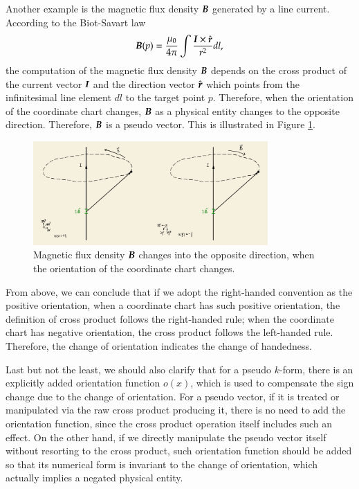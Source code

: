 \documentclass[11pt, a4paper]{book}
\begin{document}
Another example is the magnetic flux density $\boldsymbol{B}$ generated by a line current.
According to the Biot-Savart law \citep[see][page 215]{GriffithsIntroduction1999}
\begin{equation}
  \boldsymbol{B}(p) = \frac{\mu_0}{4\pi} \int \frac{\boldsymbol{I} \times \hat{\boldsymbol{r}}}{r^2} dl,
\end{equation}
the computation of the magnetic flux density $\boldsymbol{B}$ depends on the cross product of
the current vector $\boldsymbol{I}$ and the direction vector $\hat{\boldsymbol{r}}$ which points from
the infinitesimal line element $dl$ to the target point $p$. Therefore, when the
orientation of the coordinate chart changes, $\boldsymbol{B}$ as a physical entity changes to
the opposite direction. Therefore, $\boldsymbol{B}$ is a pseudo vector. This is illustrated in
Figure \ref{fig:magnetic-flux-density-as-pseudo-vector}.
\begin{figure}[htbp]
  \centering
  \includegraphics[width=0.8\textwidth, height=\textheight, keepaspectratio]{figures/2023-12-27-magnetic-flux-density-is-pseudo-vector}
  \caption{Magnetic flux density $\boldsymbol{B}$ changes into the opposite direction, when the
    orientation of the coordinate chart changes.}
  \label{fig:magnetic-flux-density-as-pseudo-vector}
\end{figure}

From above, we can conclude that if we adopt the right-handed convention as the positive
orientation, when a coordinate chart has such positive orientation, the definition of
cross product follows the right-handed rule; when the coordinate chart has negative
orientation, the cross product follows the left-handed rule. Therefore, the change of
orientation indicates the change of handedness.

Last but not the least, we should also clarify that for a pseudo $k$-form, there is an
explicitly added orientation function $o(x)$, which is used to compensate the sign change
due to the change of orientation. For a pseudo vector, if it is treated or manipulated via
the raw cross product producing it, there is no need to add the orientation function,
since the cross product operation itself includes such an effect. On the other hand, if we
directly manipulate the pseudo vector itself without resorting to the cross product, such
orientation function should be added so that its numerical form is invariant to the change
of orientation, which actually implies a negated physical entity.
\end{document}

